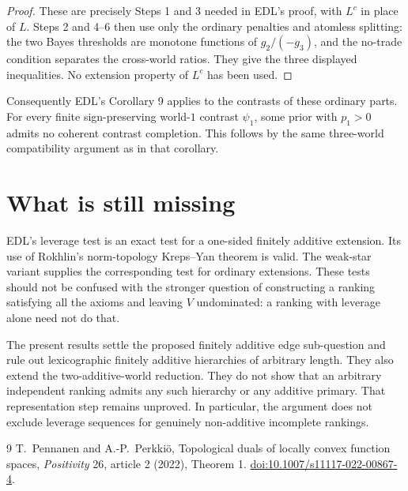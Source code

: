 \documentclass[11pt]{article}
\theoremstyle{remark}\newtheorem{remark}[theorem]{Remark}
\begin{document}
\begin{proof}
These are precisely Steps 1 and 3 needed in EDL's proof, with $L^c$ in
place of $L$. Steps 2 and 4--6 then use only the ordinary penalties and
atomless splitting: the two Bayes thresholds are monotone functions of
$g_2/(-g_3)$, and the no-trade condition separates the cross-world ratios.
They give the three displayed inequalities. No extension property of
$L^c$ has been used.
\end{proof}

Consequently EDL's Corollary 9 applies to the contrasts of these ordinary
parts. For every finite sign-preserving world-$1$ contrast $\psi_1$, some
prior with $p_1>0$ admits no coherent contrast completion. This follows by
the same three-world compatibility argument as in that corollary.

\section{What is still missing}

EDL's leverage test is an exact test for a one-sided finitely additive
extension. Its use of Rokhlin's norm-topology Kreps--Yan theorem is valid.
The weak-star variant supplies the corresponding test for ordinary
extensions. These tests should not be confused with the stronger question
of constructing a ranking satisfying all the axioms and leaving $V$
undominated: a ranking with leverage alone need not do that.

The present results settle the proposed finitely additive edge sub-question
and rule out lexicographic finitely additive hierarchies of arbitrary length.
They also extend the two-additive-world reduction. They do not show that
an arbitrary independent ranking admits any such hierarchy or any additive
primary. That representation step remains unproved. In particular, the
argument does not exclude leverage sequences for genuinely non-additive
incomplete rankings.

\begin{thebibliography}{9}
 T.~Pennanen and A.-P.~Perkki\"o,
Topological duals of locally convex function spaces,
\emph{Positivity} 26, article 2 (2022), Theorem 1.
\href{https://doi.org/10.1007/s11117-022-00867-4}{doi:10.1007/s11117-022-00867-4}.
\end{thebibliography}
\end{document}
